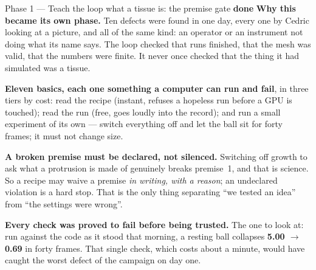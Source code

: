 \documentclass[11pt,a4paper]{article}
\newcommand{\dn}{\textcolor{good}{\textbf{done}}}
\begin{document}
\begin{phasebox}{Phase 1 --- Teach the loop what a tissue is: the premise gate \hfill \dn}
\textbf{Why this became its own phase.} Ten defects were found in one day, every one by Cedric
looking at a picture, and all of the same kind: an operator or an instrument not doing what its name
says. The loop checked that runs finished, that the mesh was valid, that the numbers were finite. It
never once checked that the thing it had simulated was a tissue.

\textbf{Eleven basics, each one something a computer can run and fail}, in three tiers by cost: read
the recipe (instant, refuses a hopeless run before a GPU is touched); read the run (free, goes
loudly into the record); and run a small experiment of its own --- switch everything off and let the
ball sit for forty frames; it must not change size.

\textbf{A broken premise must be declared, not silenced.} Switching off growth to ask what a
protrusion is made of genuinely breaks premise~1, and that is science. So a recipe may waive a
premise \emph{in writing, with a reason}; an undeclared violation is a hard stop. That is the only
thing separating ``we tested an idea'' from ``the settings were wrong''.

\textbf{Every check was proved to fail before being trusted.} The one to look at: run against the
code as it stood that morning, a resting ball collapses \textbf{5.00 $\to$ 0.69} in forty frames.
That single check, which costs about a minute, would have caught the worst defect of the campaign on
day one.
\end{phasebox}
\end{document}
